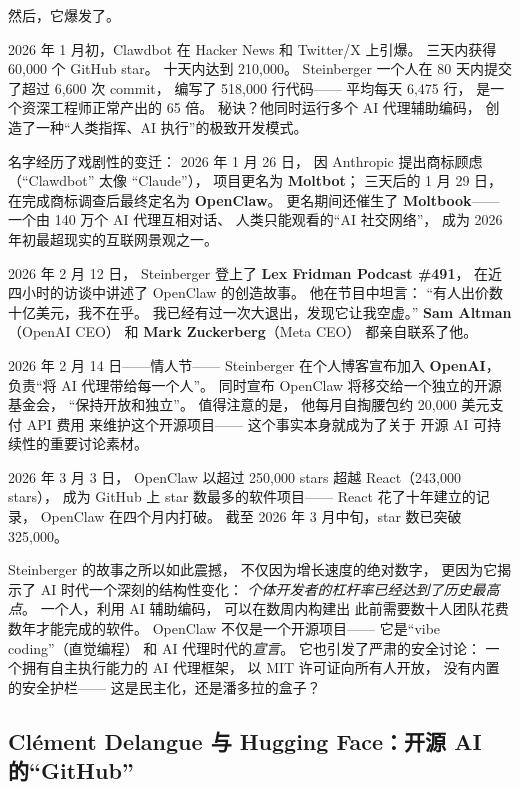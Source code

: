 然后，它爆发了。

2026 年 1 月初，Clawdbot 在 Hacker News 和 Twitter/X 上引爆。
三天内获得 60,000 个 GitHub star。
十天内达到 210,000。
Steinberger 一个人在 80 天内提交了超过 6,600 次 commit，
编写了 518,000 行代码——
平均每天 6,475 行，
是一个资深工程师正常产出的 65 倍。
秘诀？他同时运行多个 AI 代理辅助编码，
创造了一种``人类指挥、AI 执行''的极致开发模式。

名字经历了戏剧性的变迁：
2026 年 1 月 26 日，
因 Anthropic 提出商标顾虑（``Clawdbot'' 太像 ``Claude''），
项目更名为 \textbf{Moltbot}；
三天后的 1 月 29 日，
在完成商标调查后最终定名为 \textbf{OpenClaw}。
更名期间还催生了 \textbf{Moltbook}——
一个由 140 万个 AI 代理互相对话、
人类只能观看的``AI 社交网络''，
成为 2026 年初最超现实的互联网景观之一。

2026 年 2 月 12 日，
Steinberger 登上了 \textbf{Lex Fridman Podcast \#491}，
在近四小时的访谈中讲述了 OpenClaw 的创造故事。
他在节目中坦言：
``有人出价数十亿美元，我不在乎。
我已经有过一次大退出，发现它让我空虚。''
\textbf{Sam Altman}（OpenAI CEO）
和 \textbf{Mark Zuckerberg}（Meta CEO）
都亲自联系了他。

2026 年 2 月 14 日——情人节——
Steinberger 在个人博客宣布加入 \textbf{OpenAI}，
负责``将 AI 代理带给每一个人''。
同时宣布 OpenClaw 将移交给一个独立的开源基金会，
``保持开放和独立''。
值得注意的是，
他每月自掏腰包约 20,000 美元支付 API 费用
来维护这个开源项目——
这个事实本身就成为了关于
开源 AI 可持续性的重要讨论素材。

2026 年 3 月 3 日，
OpenClaw 以超过 250,000 stars
超越 React（243,000 stars），
成为 GitHub 上 star 数最多的软件项目——
React 花了十年建立的记录，
OpenClaw 在四个月内打破。
截至 2026 年 3 月中旬，star 数已突破 325,000。

\begin{corebox}
Steinberger 的故事之所以如此震撼，
不仅因为增长速度的绝对数字，
更因为它揭示了 AI 时代一个深刻的结构性变化：
\emph{个体开发者的杠杆率已经达到了历史最高点}。
一个人，利用 AI 辅助编码，
可以在数周内构建出
此前需要数十人团队花费数年才能完成的软件。
OpenClaw 不仅是一个开源项目——
它是``vibe coding''（直觉编程）
和 AI 代理时代的\emph{宣言}。
它也引发了严肃的安全讨论：
一个拥有自主执行能力的 AI 代理框架，
以 MIT 许可证向所有人开放，
没有内置的安全护栏——
这是民主化，还是潘多拉的盒子？
\end{corebox}

\subsection{Clément Delangue 与 Hugging Face：开源 AI 的``GitHub''}

